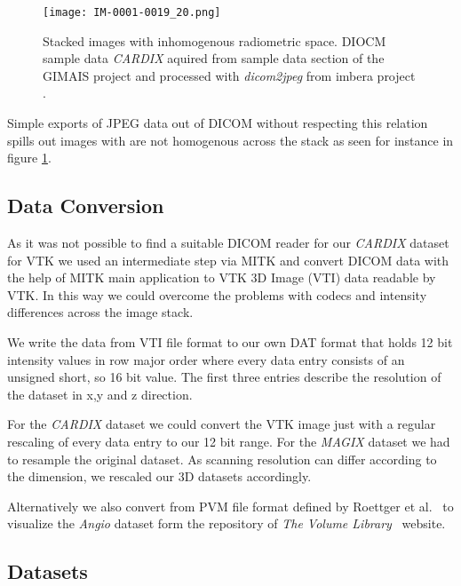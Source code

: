 \begin{figure}[h]
	\centering
	\texttt{[image: IM-0001-0019\_20.png]} \\
	\caption{Stacked images with inhomogenous radiometric space. DIOCM sample data \emph{CARDIX} \cite{gimias_sampledata_2018} aquired from sample data section of the GIMAIS project \cite{gimias_2018} and processed with \emph{dicom2jpeg} from imbera project \cite{imebra_dicom_sdk_2018}.}
	\label{fig:IM-0001-0019_20}
\end{figure}

Simple exports of JPEG data out of DICOM without respecting this relation spills out images with are not homogenous across the stack as seen for instance in figure \ref{fig:IM-0001-0019_20}.


\subsection{Data Conversion}

As it was not possible to find a suitable DICOM reader for our \emph{CARDIX} dataset \cite{gimias_sampledata_2018} for VTK we used an intermediate step via MITK and convert DICOM data with the help of MITK main application to VTK 3D Image (VTI) data readable by VTK.
In this way we could overcome the problems with codecs and intensity differences across the image stack.

We write the data from VTI file format to our own DAT format that holds 12 bit intensity values in row major order where every data entry consists of an unsigned short, so 16 bit value. The first three entries describe the resolution of the dataset in x,y and z direction.

For the \emph{CARDIX} dataset we could convert the VTK image just with a regular rescaling of every data entry to our 12 bit range. For the \emph{MAGIX} dataset we had to resample the original dataset. As scanning resolution can differ according to the dimension, we rescaled our 3D datasets accordingly. 

Alternatively we also convert from PVM file format defined by Roettger et al.~\cite{roettger_PVM_2018} to visualize the \emph{Angio} dataset form the repository of \emph{The Volume Library}~\cite{roettger_VOL_2018} website. 

\subsection{Datasets}

